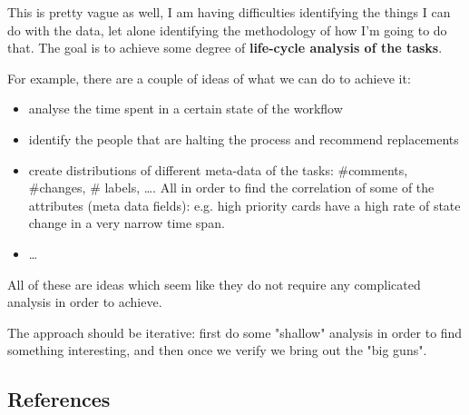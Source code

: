 \documentclass[a4paper, 12pt]{article}
\begin{document}
This is pretty vague as well, I am having difficulties identifying the things I can do with the data, let alone identifying the methodology of how I'm going to do that. The goal is to achieve some degree of \textbf{life-cycle analysis of the tasks}.

For example, there are a couple of ideas of what we can do to achieve it:

\begin{itemize}
	\item analyse the time spent in a certain state of the workflow
	
	\item identify the people that are halting the process and recommend replacements

	\item create distributions of different meta-data of the tasks: \#comments, \#changes, \# labels, \dots. All in order to find the correlation of some of the attributes (meta data fields): e.g. high priority cards have a high rate of state change in a very narrow time span.
	
	\item \dots
\end{itemize}

All of these are ideas which seem like they do not require any complicated analysis in order to achieve.

The approach should be iterative: first do some "shallow" analysis in order to find something interesting, and then once we verify we bring out the "big guns".

\subsection{References}
\label{literature}



\renewcommand\refname{}
\vspace{-50px}




%
\end{document}
